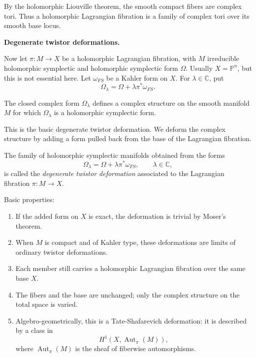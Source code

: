 \documentclass{book}
\begin{document}
\noindent
By the holomorphic Liouville theorem, the
smooth compact fibers are complex tori.
Thus a holomorphic Lagrangian fibration is a
family of complex tori over its smooth base
locus.

\medskip
{\bf Degenerate twistor deformations.}

Now let $\pi:M\to X$ be a holomorphic
Lagrangian fibration, with $M$ irreducible
holomorphic symplectic and holomorphic
symplectic form $\Omega$.
Usually $X=\mathbb{P}^n$, but this is not
essential here.
Let $\omega_{FS}$ be a Kahler form on $X$.
For $\lambda\in\mathbb{C}$, put
$$
\Omega_\lambda=
\Omega+\lambda\pi^*\omega_{FS}.
$$

\begin{lemma}
\label{claim-degenerate-twistor-form}
The closed complex form $\Omega_\lambda$
defines a complex structure on the smooth
manifold $M$ for which $\Omega_\lambda$ is a
holomorphic symplectic form.
\end{lemma}

\noindent
This is the basic degenerate twistor
deformation.
We deform the complex structure by adding a
form pulled back from the base of the
Lagrangian fibration.

\begin{definition}
\label{definition-degenerate-twistor-def}
The family of holomorphic symplectic
manifolds obtained from the forms
$$
\Omega_\lambda=
\Omega+\lambda\pi^*\omega_{FS},
\qquad \lambda\in\mathbb{C},
$$
is called the {\it degenerate twistor
deformation} associated to the Lagrangian
fibration $\pi:M\to X$.
\end{definition}

\noindent
Basic properties:
\begin{enumerate}
\item If the added form on $X$ is exact, the
deformation is trivial by Moser's theorem.
\item When $M$ is compact and of Kahler type,
these deformations are limits of ordinary
twistor deformations.
\item Each member still carries a
holomorphic Lagrangian fibration over the
same base $X$.
\item The fibers and the base are unchanged;
only the complex structure on the total
space is varied.
\item Algebro-geometrically, this is a
Tate-Shafarevich deformation: it is described
by a class in
$$
H^1(X,\operatorname{Aut}_\pi(M)),
$$
where $\operatorname{Aut}_\pi(M)$ is the
sheaf of fiberwise automorphisms.
\end{enumerate}
\end{document}
